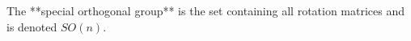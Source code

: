 \documentclass[preview]{standalone}
\begin{document}
\begin{center}
The **special orthogonal group** is the set containing all rotation matrices and is denoted $SO(n)$.
\end{center}
\end{document}
